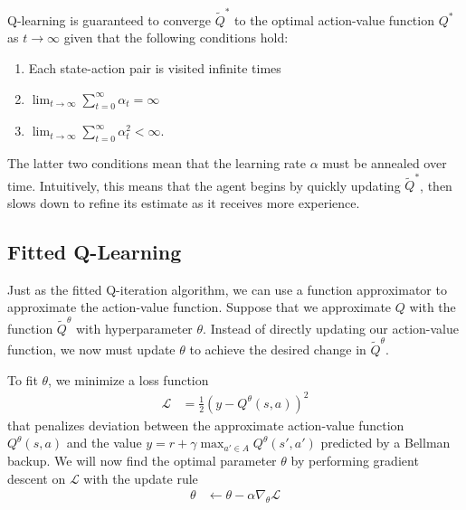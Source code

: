 \documentclass[11pt]{article}
\numberwithin{equation}{section}
\numberwithin{figure}{section}
\begin{document}
Q-learning is guaranteed to converge $\tilde{Q}^*$ to the optimal action-value
function $Q^*$ as $t \to \infty$ given that the following conditions hold:
\begin{enumerate}
    \item Each state-action pair is visited infinite times
    \item $\lim_{t \to \infty} \sum_{t = 0}^\infty \alpha_t = \infty$
    \item $\lim_{t \to \infty} \sum_{t = 0}^\infty \alpha_t^2 < \infty$.
\end{enumerate}
The latter two conditions mean that the learning rate $\alpha$ must be annealed
over time. Intuitively, this means that the agent begins by quickly updating
$\tilde{Q}^*$, then slows down to refine its estimate as it receives more
experience.

\subsection{Fitted Q-Learning}
Just as the fitted Q-iteration algorithm, we can use a function approximator to
approximate the action-value function. Suppose that we approximate $Q$ with 
the function $\tilde{Q}^\theta$ with hyperparameter $\theta$. Instead of
directly updating our action-value function, we now must update $\theta$ to
achieve the desired change in $\tilde{Q}^\theta$.

To fit $\theta$, we minimize a loss function
\begin{align*}
    \mathcal{L} &= \frac{1}{2} \left( y - Q^\theta(s, a) \right)^2
\end{align*}
that penalizes deviation between the approximate action-value function
$Q^\theta(s, a)$ and the value $y = r + \gamma \max_{a' \in A} Q^\theta(s',
a')$ predicted by a Bellman backup. We will now find the optimal parameter
$\theta$ by performing gradient descent on $\mathcal{L}$ with the update rule
\begin{align}
    \theta &\gets \theta - \alpha \nabla_\theta \mathcal{L}
    \label{eqn:qlearning-step}
\end{align}
\end{document}
